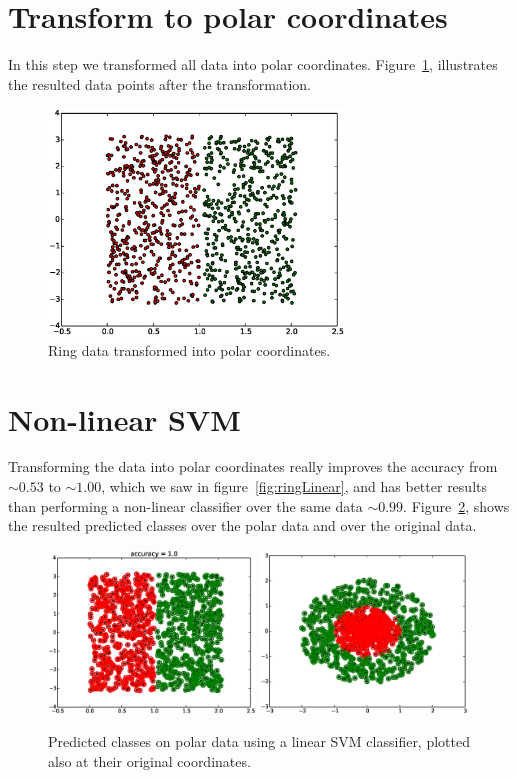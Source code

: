 \documentclass[a4paper,10pt]{article}
\begin{document}
\section{Transform to polar coordinates}
In this step we transformed all data into polar coordinates. Figure~\ref{fig:polarData}, illustrates the resulted data points after the transformation.
\begin{figure}[ht!]
    \centering
    \includegraphics[width=0.70\textwidth]{polarData.eps}
    \caption{Ring data transformed into polar coordinates.}
    \label{fig:polarData}
\end{figure}

\section{Non-linear SVM}
Transforming the data into polar coordinates really improves the accuracy from $\sim 0.53$ to $\sim 1.00$, which we saw in figure~\ref{fig:ringLinear}, and has better results than performing a non-linear classifier over the same data $\sim 0.99$. Figure~\ref{fig:linearSVMonPolar}, shows the resulted predicted classes over the polar data and over the original data.
\begin{figure}[ht!]
    \centering
    \includegraphics[width=0.49\textwidth]{linearSVMonPolar.eps}
    \includegraphics[width=0.49\textwidth]{final.eps}
    \caption{Predicted classes on polar data using a linear SVM classifier, plotted also at their original coordinates.}
    \label{fig:linearSVMonPolar}
\end{figure}
\end{document}
